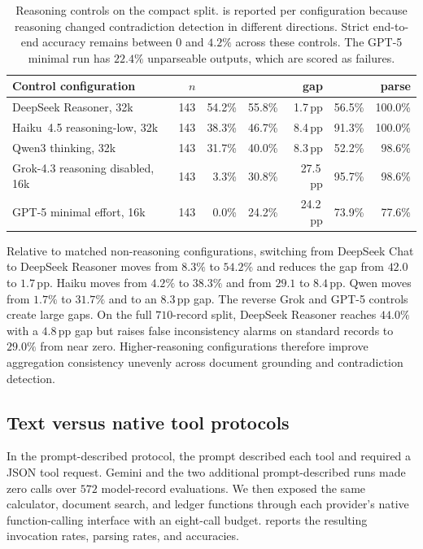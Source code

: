 \begin{table}[t]
\centering
\footnotesize
\setlength{\tabcolsep}{4pt}
\begin{tabular}{@{}lrrrrrr@{}}
\toprule
Control configuration & $n$ & \bsexact{} & \bsrecon{} & gap & \incCode{} & parse \\
\midrule
DeepSeek Reasoner, 32k & 143 & 54.2\% & 55.8\% & 1.7\,pp & 56.5\% & 100.0\% \\
Haiku~4.5 reasoning-low, 32k & 143 & 38.3\% & 46.7\% & 8.4\,pp & 91.3\% & 100.0\% \\
Qwen3 thinking, 32k & 143 & 31.7\% & 40.0\% & 8.3\,pp & 52.2\% & 98.6\% \\
Grok-4.3 reasoning disabled, 16k & 143 & 3.3\% & 30.8\% & 27.5\,pp & 95.7\% & 98.6\% \\
GPT-5 minimal effort, 16k & 143 & 0.0\% & 24.2\% & 24.2\,pp & 73.9\% & 77.6\% \\
\bottomrule
\end{tabular}
\caption{Reasoning controls on the compact split. \incCode{} is reported per configuration because reasoning changed contradiction detection in different directions. Strict end-to-end accuracy remains between $0$ and $4.2\%$ across these controls. The GPT-5 minimal run has $22.4\%$ unparseable outputs, which are scored as failures.}
\label{tab:reasoning-controls}
\end{table}

Relative to matched non-reasoning configurations, switching from DeepSeek Chat to DeepSeek Reasoner moves \bsexact{} from $8.3\%$ to $54.2\%$ and reduces the gap from $42.0$ to $1.7$\,pp. Haiku moves from $4.2\%$ to $38.3\%$ and from $29.1$ to $8.4$\,pp. Qwen moves from $1.7\%$ to $31.7\%$ and to an $8.3$\,pp gap. The reverse Grok and GPT-5 controls create large gaps. On the full $710$-record split, DeepSeek Reasoner reaches $44.0\%$ \bsexact{} with a $4.8$\,pp gap but raises false inconsistency alarms on standard records to $29.0\%$ from near zero. Higher-reasoning configurations therefore improve aggregation consistency unevenly across document grounding and contradiction detection.

\subsection{Text versus native tool protocols}
\label{appx:native-tools}

In the prompt-described protocol, the prompt described each tool and required a JSON tool request. Gemini and the two additional prompt-described runs made zero calls over $572$ model-record evaluations. We then exposed the same calculator, document search, and ledger functions through each provider's native function-calling interface with an eight-call budget.  reports the resulting invocation rates, parsing rates, and accuracies.

